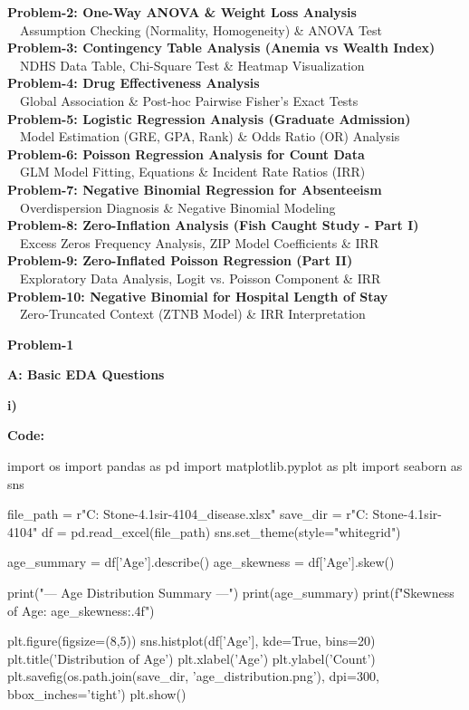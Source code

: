 \documentclass[12pt,a4paper]{article}
\newcommand{\tocline}[1]{\vspace{0.25cm}\noindent\textbf{\large #1}\\[0.1cm]}
\newcommand{\tocsub}[1]{\noindent\hspace*{6mm}\textbullet~~#1\\[0.05cm]}
\begin{document}
\tocline{Problem-2: One-Way ANOVA \& Weight Loss Analysis}
\tocsub{Assumption Checking (Normality, Homogeneity) \& ANOVA Test}

\tocline{Problem-3: Contingency Table Analysis (Anemia vs Wealth Index)}
\tocsub{NDHS Data Table, Chi-Square Test \& Heatmap Visualization}

\tocline{Problem-4: Drug Effectiveness Analysis}
\tocsub{Global Association \& Post-hoc Pairwise Fisher's Exact Tests}

\tocline{Problem-5: Logistic Regression Analysis (Graduate Admission)}
\tocsub{Model Estimation (GRE, GPA, Rank) \& Odds Ratio (OR) Analysis}

\tocline{Problem-6: Poisson Regression Analysis for Count Data}
\tocsub{GLM Model Fitting, Equations \& Incident Rate Ratios (IRR)}

\tocline{Problem-7: Negative Binomial Regression for Absenteeism}
\tocsub{Overdispersion Diagnosis \& Negative Binomial Modeling}

\tocline{Problem-8: Zero-Inflation Analysis (Fish Caught Study - Part I)}
\tocsub{Excess Zeros Frequency Analysis, ZIP Model Coefficients \& IRR}

\tocline{Problem-9: Zero-Inflated Poisson Regression (Part II)}
\tocsub{Exploratory Data Analysis, Logit vs. Poisson Component \& IRR}

\tocline{Problem-10: Negative Binomial for Hospital Length of Stay}
\tocsub{Zero-Truncated Context (ZTNB Model) \& IRR Interpretation}

\newpage



\begin{center}
\Large \textbf{Problem-1}
\end{center}
\textbf{A: Basic EDA Questions}

\textbf{i)}

\textbf{Code:}
\begin{codebox}
import os
import pandas as pd
import matplotlib.pyplot as plt
import seaborn as sns

file_path = r"C:\Users\hp\OneDrive\Desktop
\Reality Stone-4.1\Siddik sir-4104\lung_disease.xlsx"
save_dir = r"C:\Users\hp\OneDrive\Desktop
\Reality Stone-4.1\Siddik sir-4104"
df = pd.read_excel(file_path)
sns.set_theme(style="whitegrid")

age_summary = df['Age'].describe()
age_skewness = df['Age'].skew()

print("--- Age Distribution Summary ---")
print(age_summary)
print(f"Skewness of Age: {age_skewness:.4f}")

plt.figure(figsize=(8,5))
sns.histplot(df['Age'], kde=True, bins=20)
plt.title('Distribution of Age')
plt.xlabel('Age')
plt.ylabel('Count')
plt.savefig(os.path.join(save_dir, 
'age_distribution.png'), dpi=300, bbox_inches='tight')
plt.show()
\end{codebox}
\end{document}
